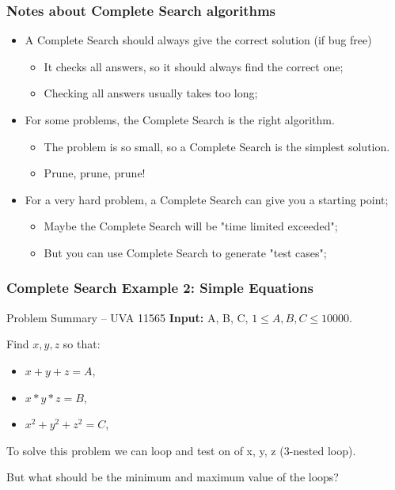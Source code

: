 \begin{frame}
  \frametitle{Notes about Complete Search algorithms}
  \begin{itemize}
  \item A Complete Search should always give the correct solution (if bug free)\\
    \begin{itemize}
    \item It checks all answers, so it should always find the correct one;
    \item Checking all answers usually takes too long;
    \end{itemize}

    \bigskip

  \item For some problems, the Complete Search is the right algorithm.
    \begin{itemize}
    \item The problem is so small, so a Complete Search is the simplest solution.
    \item Prune, prune, prune!
    \end{itemize}

    \bigskip

  \item For a very hard problem, a Complete Search can give you a starting point;
    \begin{itemize}
    \item Maybe the Complete Search will be "time limited exceeded";
    \item But you can use Complete Search to generate "test cases";
    \end{itemize}
  \end{itemize}
\end{frame}

\begin{frame}
  \frametitle{Complete Search Example 2: Simple Equations}
  \begin{block}{Problem Summary -- UVA 11565}
    {\bf Input:} A, B, C, $1 \leq A,B,C \leq 10000$.\bigskip

    Find $x,y,z$ so that:
    \begin{itemize}
    \item $x+y+z=A$,
    \item $x*y*z=B$,
    \item $x^2+y^2+z^2=C$,
    \end{itemize}

    \bigskip
  \end{block}
  \bigskip

  To solve this problem we can loop and test on of x, y, z (3-nested loop).
  \bigskip

  But what should be the minimum and maximum value of the loops?
\end{frame}

